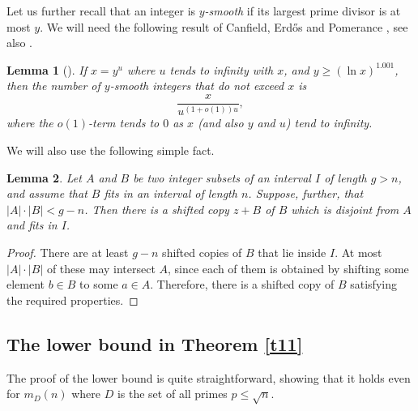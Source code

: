 \documentclass[12pt]{amsart}
\theoremstyle{plain}
\newtheorem{lemma}{Lemma}
\numberwithin{equation}{section}
\begin{document}
Let us further recall that an integer is \emph{$y$-smooth} if its largest prime divisor is at most $y$. We will need the following result of Canfield, Erd\H{o}s and Pomerance \cite{CEP}, see also \cite{Bru}. 
\begin{lemma}[\cite{CEP}]
	\label{l22}
	If $x=y^u$ where $u$ tends to infinity with $x$, and $y \geqslant (\ln x)^{1.001}$, then the number of $y$-smooth integers that do not exceed $x$ is 
	$$\frac{x}{u^{(1+o(1))u}},$$
	where the $o(1)$-term tends to $0$ as $x$ (and also $y$ and $u$) tend to infinity.
\end{lemma}
We will also use the following simple fact.
\begin{lemma}
	\label{l23}
	Let $A$ and $B$ be two integer subsets of an interval $I$ of length $g>n$, and assume that $B$ fits in an interval of length $n$. Suppose, further, that $|A| \cdot |B| < g-n$. Then there is a shifted 	copy $z+B$ of $B$ which is disjoint from $A$ and fits in $I$.
\end{lemma}
\begin{proof}
	There are at least $g-n$ shifted copies of $B$ that lie inside $I$. At most $|A| \cdot |B|$ of these may intersect $A$, since each of them is obtained by shifting some element $b \in B$ to some $a \in A$. Therefore, there is a shifted copy of $B$  satisfying the required properties.
\end{proof}

\subsection{The lower bound in Theorem \ref{t11}}
The proof of the lower bound is quite straightforward, showing that it holds even for $m_D(n)$ where $D$ is the set of all primes $p \leqslant \sqrt n$.
\end{document}
